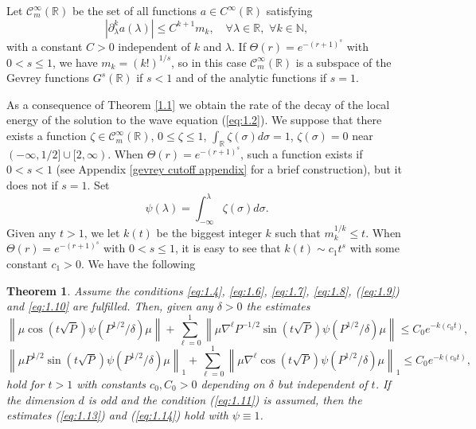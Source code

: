 \documentclass[11pt]{amsart}
\newtheorem{Theorem}{Theorem}[section]
\numberwithin{equation}{section}
\def\R{{\mathbb R}}
\begin{document}
Let $\mathcal{C}_m^\infty(\R)$ be the set of all functions $a\in C^\infty(\R)$ satisfying
\begin{equation*}
\left|\partial_\lambda^ka(\lambda)\right|\le C^{k+1}m_k,\quad\forall\lambda\in\R,\,\,\forall k\in\mathbb{N},
\end{equation*}
 with a constant $C>0$ independent of $k$ and $\lambda$.
 If $\Theta(r)=e^{-(r+1)^s}$ with $0<s\le 1$, we have
$m_k=(k!)^{1/s}$, so in this case $\mathcal{C}_m^\infty(\R)$ is a subspace of the 
Gevrey functions $G^s(\R)$ if $s<1$ and of the analytic functions if $s=1$. 

As a consequence of Theorem \ref{1.1} we obtain the rate of the decay
of the local energy of the solution to the wave equation (\ref{eq:1.2}). 
We suppose that there exists a function $\zeta\in \mathcal{C}_m^\infty(\R)$, $0\le\zeta\le 1$, $\int_{\R}\zeta(\sigma)d\sigma=1$,
$\zeta(\sigma)=0$ near $(-\infty, 1/2] \cup [2, \infty)$. When $\Theta(r)=e^{-(r+1)^s}$, such a function exists if $0<s<1$ (see Appendix \ref{gevrey cutoff appendix} for a brief construction), but it does not if $s=1$. Set
\begin{equation*}
\psi(\lambda)=\int_{-\infty}^\lambda\zeta(\sigma)d\sigma.
\end{equation*}
Given any $t>1$, we let $k(t)$ be the biggest
integer $k$ such that $m_k^{1/k}\le t$. 
When $\Theta(r)=e^{-(r+1)^s}$ with $0<s\le 1$, it is easy to see that $k(t)\sim c_1t^s$ with some constant $c_1>0$.
We have the following 

\begin{Theorem} \label{1.2}
Assume the conditions \eqref{eq:1.4}, \eqref{eq:1.6}, \eqref{eq:1.7}, \eqref{eq:1.8}, (\ref{eq:1.9}) and \eqref{eq:1.10} are fulfilled. 
Then, given any $\delta>0$ the estimates 
 \begin{equation}\label{eq:1.13}
\left\|\mu\cos(t\sqrt{P})\psi(P^{1/2}/\delta)\mu\right\|+\sum_{\ell=0}^1
\left\|\mu\nabla^\ell P^{-1/2}\sin(t\sqrt{P})\psi(P^{1/2}/\delta)\mu\right\|\le C_0e^{-k(c_0t)},
\end{equation}
\begin{equation}\label{eq:1.14}
\left\|\mu P^{1/2}\sin(t\sqrt{P})\psi(P^{1/2}/\delta)\mu\right\|_1+\sum_{\ell=0}^1
\left\|\mu\nabla^\ell \cos(t\sqrt{P})\psi(P^{1/2}/\delta)\mu\right\|_1\le C_0e^{-k(c_0t)},
\end{equation}
 hold for $t>1$ with constants $c_0,C_0>0$ depending on $\delta$ but independent of $t$. If the dimension $d$ is odd and the condition
 (\ref{eq:1.11}) is assumed, then the estimates (\ref{eq:1.13}) and (\ref{eq:1.14}) hold with $\psi\equiv 1$. 
 \end{Theorem}
 
\end{document}
